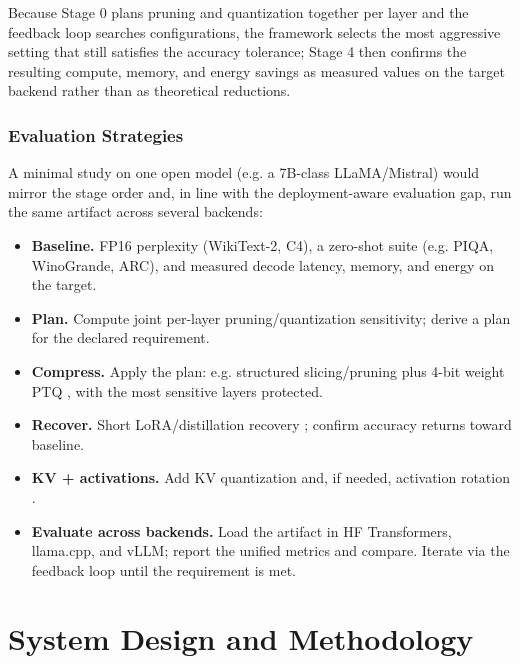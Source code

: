 \documentclass[
11pt, %
english, %
singlespacing, %
headsepline, %
]{MastersDoctoralThesis} %
\begin{document}
Because Stage 0 plans pruning and quantization together per layer and the feedback loop searches configurations, the framework selects the most aggressive setting that still satisfies the accuracy tolerance; Stage 4 then confirms the resulting compute, memory, and energy savings as measured values on the target backend rather than as theoretical reductions.

\subsection{Evaluation Strategies}

A minimal study on one open model (e.g. a 7B-class LLaMA/Mistral) would mirror the stage order and, in line with the deployment-aware evaluation gap, run the same artifact across several backends:

\begin{itemize}

  \item \textbf{Baseline.} FP16 perplexity (WikiText-2, C4), a zero-shot suite (e.g. PIQA, WinoGrande, ARC), and measured decode latency, memory, and energy on the target.

  \item \textbf{Plan.} Compute joint per-layer pruning/quantization sensitivity; derive a plan for the declared requirement.

  \item \textbf{Compress.} Apply the plan: e.g. structured slicing/pruning \cite{ma2023llmpruner,ashkboos2024slicegpt} plus 4-bit weight PTQ \cite{frantar2023gptq,lin2024awq}, with the most sensitive layers protected.

  \item \textbf{Recover.} Short LoRA/distillation recovery \cite{muralidharan2024minitron}; confirm accuracy returns toward baseline.

  \item \textbf{KV + activations.} Add KV quantization \cite{hooper2024kvquant} and, if needed, activation rotation \cite{ashkboos2024quarot}.

  \item \textbf{Evaluate across backends.} Load the artifact in HF Transformers, llama.cpp, and vLLM; report the unified metrics and compare. Iterate via the feedback loop until the requirement is met.

\end{itemize}


\chapter{System Design and Methodology}
\label{Chapter4}
\end{document}
